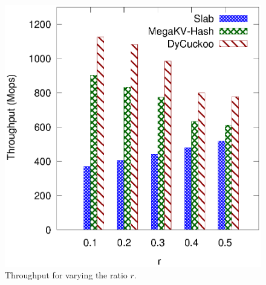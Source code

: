 \begin{figure}[htp]
\begin{minipage}{0.19\linewidth}
		\centerline{\dsali}
	\end{minipage}
	\begin{minipage}{0.19\linewidth}\centering
		\includegraphics[width=\linewidth]{pic/dynamic/r/dynamic_random.eps}
		\centerline{\dsrandom}
	\end{minipage}
	\caption{Throughput for varying the ratio $r$.}
	\label{fig:vary-r-time}
\end{figure}
%
